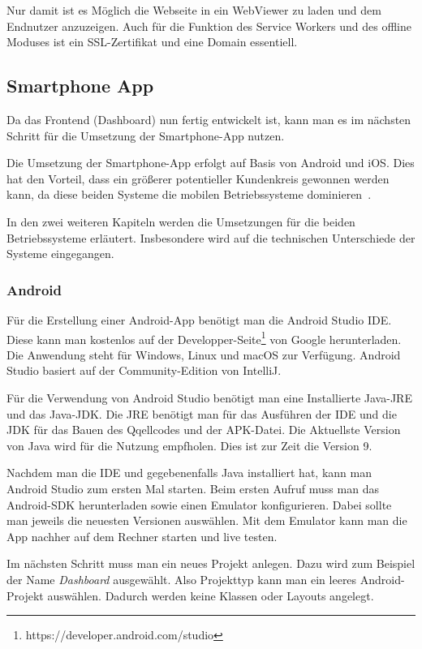 Nur damit ist es Möglich die Webseite in ein WebViewer zu laden und dem Endnutzer anzuzeigen. Auch für die
Funktion des Service Workers und des offline Moduses ist ein SSL-Zertifikat und eine Domain essentiell.

\subsection{Smartphone App}
Da das Frontend (Dashboard) nun fertig entwickelt ist, kann man es im nächsten Schritt für die Umsetzung der
Smartphone-App nutzen.

Die Umsetzung der Smartphone-App erfolgt auf Basis von Android und iOS. Dies hat den Vorteil, dass ein größerer
potentieller Kundenkreis gewonnen werden kann, da diese beiden Systeme die mobilen Betriebssysteme
dominieren~\cite{online_umsetzung_mobileos}.

In den zwei weiteren Kapiteln werden die Umsetzungen für die beiden Betriebssysteme erläutert. Insbesondere wird auf die
technischen Unterschiede der Systeme eingegangen.

\subsubsection{Android}
Für die Erstellung einer Android-App benötigt man die Android Studio IDE. Diese kann man kostenlos auf der
Developper-Seite\footnote{https://developer.android.com/studio} von Google herunterladen. Die Anwendung steht für
Windows, Linux und macOS zur Verfügung. Android Studio basiert auf der Community-Edition von IntelliJ.

Für die Verwendung von Android Studio benötigt man eine Installierte Java-JRE und das Java-JDK. Die JRE benötigt man für
das Ausführen der IDE und die JDK für das Bauen des Qqellcodes und der APK-Datei. Die Aktuellste Version von Java wird
für die Nutzung empfholen. Dies ist zur Zeit die Version 9.

Nachdem man die IDE und gegebenenfalls Java installiert hat, kann man Android Studio zum ersten Mal starten. Beim ersten
Aufruf muss man das Android-SDK herunterladen sowie einen Emulator konfigurieren. Dabei sollte man jeweils die neuesten
Versionen auswählen. Mit dem Emulator kann man die App nachher auf dem Rechner starten und live testen.

Im nächsten Schritt muss man ein neues Projekt anlegen. Dazu wird zum Beispiel der Name \textit{Dashboard} ausgewählt.
Also Projekttyp kann man ein leeres Android-Projekt auswählen. Dadurch werden keine Klassen oder Layouts angelegt.

